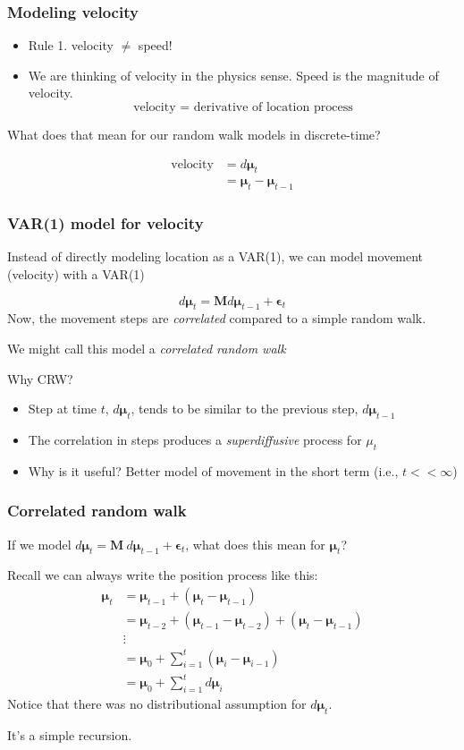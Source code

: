 \documentclass[36pt,handout]{beamer}
\newcommand{\ft}[1]{\frametitle{#1}}
\newcommand{\bmu}{\boldsymbol{\mu}}
\newcommand{\be}{\boldsymbol{\epsilon}}
\begin{document}

\begin{frame}
\ft{Modeling velocity}

\begin{itemize}
\item Rule 1. velocity $\ne$ speed!
\item We are thinking of velocity in the physics sense. Speed is the magnitude of velocity. 
$$\mbox{velocity = derivative of location process}$$
\end{itemize}
\bigskip

What does that mean for our random walk models in discrete-time? 

$$
\begin{aligned}
\mbox{velocity} &= d\bmu_t \\ 
&= \bmu_t-\bmu_{t-1} 
\end{aligned}
$$
\end{frame}


\begin{frame}
\ft{VAR(1) model for velocity}

Instead of directly modeling location as a VAR(1), we can model movement (velocity) with a VAR(1)

$$d\bmu_t = \mathbf{M}d\bmu_{t-1} + \be_t$$
Now, the movement steps are {\em correlated} compared to a simple random walk. 
\medskip

We might call this model  a {\em correlated random walk}
\medskip

\textcolor{noaaturq}{\Large Why CRW?}
\begin{itemize}
\item Step at time $t$, $d\bmu_t$, tends to be similar to the previous step, $d\bmu_{t-1}$
\item The correlation in steps produces a {\em superdiffusive} process for $\mu_t$
\item Why is it useful? Better model of movement in the short term (i.e., $t<<\infty$)
\end{itemize}
\end{frame}


\begin{frame}
\ft{Correlated random walk}

If we model $d\bmu_t = \mathbf{M}\ d\bmu_{t-1} + \be_t$, what does this mean for  $\bmu_t$?

Recall we can always write the position process like this:
$$
\begin{aligned}
\bmu_t &= \bmu_{t-1} + (\bmu_t-\bmu_{t-1}) \\ 
&= \bmu_{t-2} + (\bmu_{t-1}-\bmu_{t-2}) + (\bmu_t-\bmu_{t-1}) \\ 
&\vdots \\ 
&= \bmu_0 + \sum_{i=1}^t (\bmu_{i}-\bmu_{i-1}) \\ 
&= \bmu_0 + \sum_{i=1}^t d\bmu_i 
\end{aligned}
$$
Notice that there was no distributional assumption for $d\bmu_t$. 

It's a simple recursion. 

\end{frame}
\end{document}
